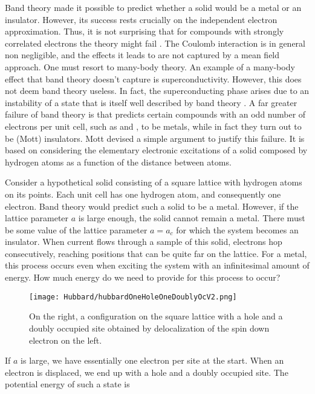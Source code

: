 Band theory made it possible to predict whether a solid would be a metal or an insulator.
However, its success rests crucially on the independent electron approximation.
Thus, it is not surprising that for compounds with strongly correlated electrons the theory might fail \cite{mila_physique_2007}.
The Coulomb interaction is in general non negligible, and the effects it leads to are not captured by a mean field approach.
One must resort to many-body theory.
An example of a many-body effect that band theory doesn't capture is  superconductivity.
However, this does not deem band theory useless.
In fact, the superconducting phase arises due to an instability of a state that is itself well described by band theory \cite{gennes_superconductivity_1999}.
A far greater failure of band theory is that predicts certain compounds with an odd number of electrons per unit cell, such as  and ,  to be metals, while in fact  they turn out to be (Mott) insulators.
Mott devised a simple argument to justify this failure.
It is based on considering the elementary electronic excitations of a solid composed by hydrogen atoms as a function of the distance between atoms.

Consider a hypothetical solid consisting of a square lattice with hydrogen atoms on its points.
Each unit cell has one hydrogen atom, and consequently one electron.
Band theory would predict such a solid to be a metal.
However, if the lattice parameter $a$ is large enough, the solid cannot remain a metal.
There must be some value of the lattice parameter $a = a_c$ for which the system becomes an insulator.
When current flows through a sample of this solid, electrons hop consecutively, reaching positions that can be quite far on the lattice.
For a metal, this process occurs even when exciting the system with an infinitesimal amount of energy.
How much energy do we need to provide for this process to occur?

\begin{figure}[ht!]\label{hubbardOneHoleOneDoublyOc}
\centering
\texttt{[image: Hubbard/hubbardOneHoleOneDoublyOcV2.png]}
\caption[Configuration of the Hubbard model on the square lattice with a hole and a doubly occupied site.]{On the right, a configuration on the square lattice with a hole and a doubly occupied site obtained by delocalization of the spin down electron on the left.}
\end{figure}

If $a$ is large, we have essentially one electron per site at the start.
When an electron is displaced, we end up with a hole and a doubly occupied site.
The potential energy of such a state is

